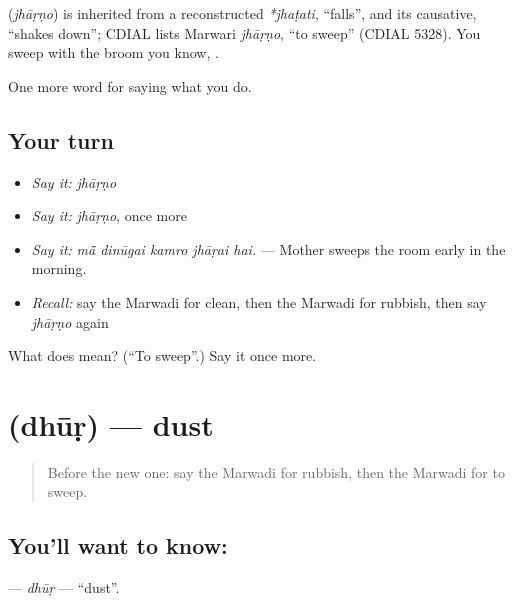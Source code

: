 \begin{cousinweb}
\textbf{} (\emph{jhāṛṇo}) is inherited from a reconstructed \emph{*jhaṭati}, \textquotedblleft{}falls\textquotedblright{}, and its causative, \textquotedblleft{}shakes down\textquotedblright{}; CDIAL lists Marwari \emph{jhāṛṇo}, \textquotedblleft{}to sweep\textquotedblright{} (CDIAL 5328). You sweep with the broom you know, \textbf{}.
\end{cousinweb}

\begin{grammarlens}[title={What you've built}]
One more word for saying what you do.
\end{grammarlens}

\subsection*{Your turn}
\begin{itemize}
\raggedright
  \item \emph{Say it:} \emph{jhāṛṇo}
  \item \emph{Say it:} \emph{jhāṛṇo}, once more
  \item \emph{Say it:} \emph{mā̃ dinūgai kamro jhāṛai hai.} — Mother sweeps the room early in the morning.
  \item \emph{Recall:} say the Marwadi for clean, then the Marwadi for rubbish, then say \emph{jhāṛṇo} again
\end{itemize}

\begin{tcolorbox}[breakable,colback=teal!4,colframe=teal!35!black,title={Before you move on}]
What does  mean? (\textquotedblleft{}To sweep\textquotedblright{}.) Say it once more.
\end{tcolorbox}
\section[\texorpdfstring{\mw{धूड़} (dhūṛ)}{धूड़ (dhūṛ)}]{ (dhūṛ) — dust}

\label{lesson:MW-C172-dhur}



\begin{quote}
Before the new one: say the Marwadi for rubbish, then the Marwadi for to sweep.
\end{quote}

\subsection*{You'll want to know: }
\textbf{} — \emph{dhūṛ} — \textquotedblleft{}dust\textquotedblright{}.

